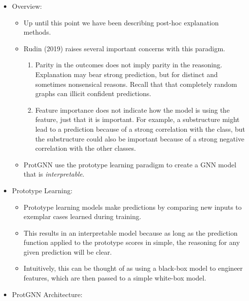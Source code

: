\documentclass[
  11pt,
  letterpaper,
]{article}
\begin{document}
\begin{itemize}
\item
  Overview:

  \begin{itemize}
  \item
    Up until this point we have been describing post-hoc explanation
    methods.
  \item
    Rudin (2019) raises several important concerns with this paradigm.

    \begin{enumerate}
    \def\labelenumi{\arabic{enumi}.}
    \item
      Parity in the outcomes does not imply parity in the reasoning.
      Explanation may bear strong prediction, but for distinct and
      sometimes nonsensical reasons. Recall that that completely random
      graphs can illicit confident predictions.
    \item
      Feature importance does not indicate how the model is using the
      feature, just that it is important. For example, a substructure
      might lead to a prediction because of a strong correlation with
      the class, but the substructure could also be important because of
      a strong negative correlation with the other classes.
    \end{enumerate}
  \item
    ProtGNN use the prototype learning paradigm to create a GNN model
    that is \emph{interpretable}.
  \end{itemize}
\item
  Prototype Learning:

  \begin{itemize}
  \item
    Prototype learning models make predictions by comparing new inputs
    to exemplar cases learned during training.
  \item
    This results in an interpretable model because as long as the
    prediction function applied to the prototype scores in simple, the
    reasoning for any given prediction will be clear.
  \item
    Intuitively, this can be thought of as using a black-box model to
    engineer features, which are then passed to a simple white-box
    model.
  \end{itemize}
\item
  ProtGNN Architecture:


\end{itemize}
\end{document}
